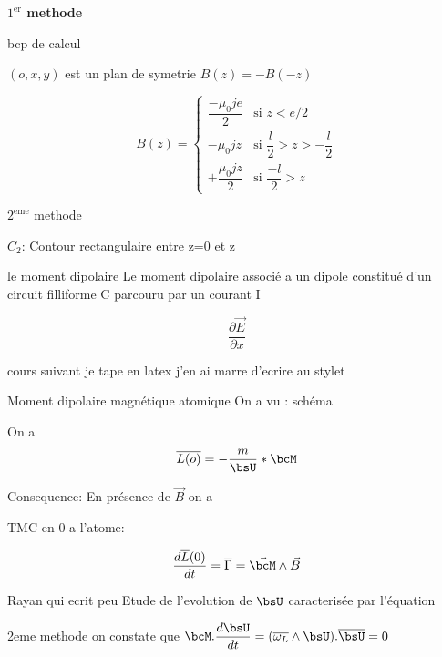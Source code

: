     
    
    \textbf{$1^{\text{er}}$ methode }
    
    bcp de calcul 
    
    $(o,x,y)$ est un plan de symetrie 
    \implies $B(z) = - B(-z) $
    
    
    
    \[   B(z) = \begin{cases} \dfrac{-\mu_0 j e}{2}  & \text{si } z < e/2 \\[0.5cm]  -\mu_0 j z & \text{si } \dfrac{l}{2}>z> -\dfrac{l}{2} \\[0.5cm]  +\dfrac{\mu_0 j z}{2} & \text{si } \dfrac{-l}{2}>z  \end{cases} \]
    
    
    \underline{$2^{\text{eme}}$ methode }
    
    $C_2$: Contour rectangulaire entre z=0 et z
    
    
    
    \begin{definition}{le moment dipolaire}{}
        Le moment dipolaire associé a un dipole constitué d'un circuit filliforme C parcouru par un courant I 
        
    \end{definition}
    
    \[ \dfrac{\partial \vec E}{\partial x}\]
    
    \vspace{5cm}
    cours suivant 
    je tape en latex j'en ai marre d'ecrire au stylet 
    
    \begin{example}{Moment dipolaire magnétique atomique}{}
        On a vu : schéma  
        
        On a $$\overline{L(o)} = -\dfrac{m}{\bsU}*\bcM$$
        
        Consequence: En présence de $\vec{B}$ on a 
        
        TMC en 0 a l'atome:
        
        \[  \dfrac{d\overline{L}(0)}{dt} = \overline{\Gamma} = \vec{\bcM} \wedge \vec{B} \]
        
        
    \end{example}
    
    \begin{form}{Rayan qui ecrit peu}{}
        Etude de l'evolution de $\bsU$ caracterisée par l'équation 
        
        2eme methode on constate que $\bcM.\dfrac{d\bsU}{dt} = (\overline{\omega_L} \wedge \bsU). \overline{\bsU} = 0 $
        
        
        
    \end{form}